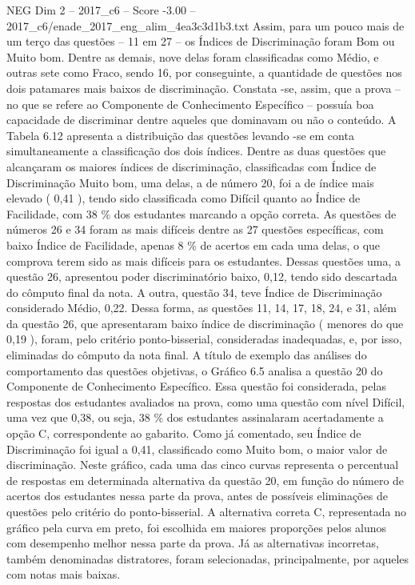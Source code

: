 \begin{textsample}{NEG Dim 2 – 2017\_c6 – Score -3.00 – 2017\_c6/enade\_2017\_eng\_alim\_4ea3c3d1b3.txt}
Assim, para um pouco mais de um terço das questões – 11 em 27 – os Índices de Discriminação foram Bom ou Muito bom.
Dentre as demais, nove delas foram classificadas como Médio, e outras sete como Fraco, sendo 16, por conseguinte, a quantidade de questões nos dois patamares mais baixos de discriminação.
Constata -se, assim, que a prova – no que se refere ao Componente de Conhecimento Específico – possuía boa capacidade de discriminar dentre aqueles que dominavam ou não o conteúdo.
A Tabela 6.12 apresenta a distribuição das questões levando -se em conta simultaneamente a classificação dos dois índices.
Dentre as duas questões que alcançaram os maiores índices de discriminação, classificadas com Índice de Discriminação Muito bom, uma delas, a de número 20, foi a de índice mais elevado ( 0,41 ), tendo sido classificada como Difícil quanto ao Índice de Facilidade, com 38 \% dos estudantes marcando a opção correta.
As questões de números 26 e 34 foram as mais difíceis dentre as 27 questões específicas, com baixo Índice de Facilidade, apenas 8 \% de acertos em cada uma delas, o que comprova terem sido as mais difíceis para os estudantes.
Dessas questões uma, a questão 26, apresentou poder discriminatório baixo, 0,12, tendo sido descartada do cômputo final da nota.
A outra, questão 34, teve Índice de Discriminação considerado Médio, 0,22.
Dessa forma, as questões 11, 14, 17, 18, 24, e 31, além da questão 26, que apresentaram baixo índice de discriminação ( menores do que 0,19 ), foram, pelo critério ponto-bisserial, consideradas inadequadas, e, por isso, eliminadas do cômputo da nota final.
A título de exemplo das análises do comportamento das questões objetivas, o Gráfico 6.5 analisa a questão 20 do Componente de Conhecimento Específico.
Essa questão foi considerada, pelas respostas dos estudantes avaliados na prova, como uma questão com nível Difícil, uma vez que 0,38, ou seja, 38 \% dos estudantes assinalaram acertadamente a opção C, correspondente ao gabarito.
Como já comentado, seu Índice de Discriminação foi igual a 0,41, classificado como Muito bom, o maior valor de discriminação.
Neste gráfico, cada uma das cinco curvas representa o percentual de respostas em determinada alternativa da questão 20, em função do número de acertos dos estudantes nessa parte da prova, antes de possíveis eliminações de questões pelo critério do ponto-bisserial.
A alternativa correta C, representada no gráfico pela curva em preto, foi escolhida em maiores proporções pelos alunos com desempenho melhor nessa parte da prova.
Já as alternativas incorretas, também denominadas distratores, foram selecionadas, principalmente, por aqueles com notas mais baixas.

\end{textsample}
